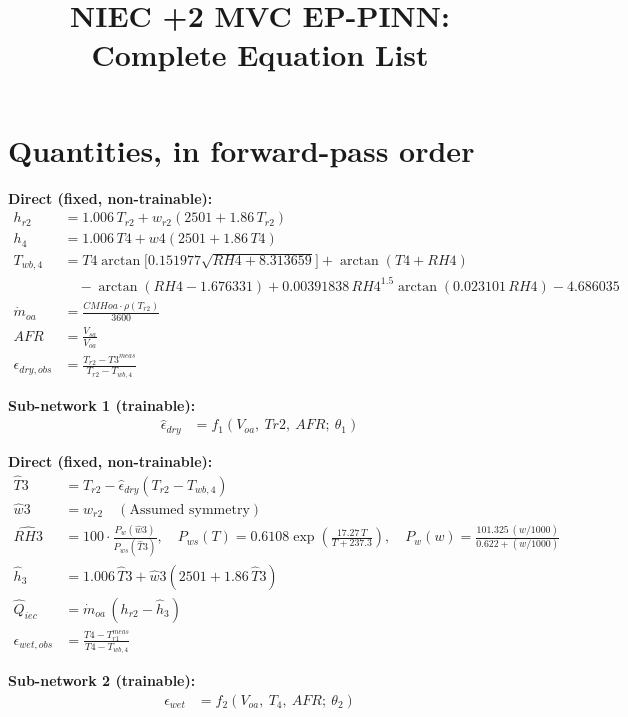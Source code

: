 \documentclass[11pt]{article}
\title{\vspace{-1.5em}NIEC +2 MVC EP-PINN: Complete Equation List\vspace{-1em}}
\author{}
\date{}
\begin{document}
\maketitle
\vspace{-2em}

\section*{Quantities, in forward-pass order}

\noindent\textbf{Direct (fixed, non-trainable):}
\begin{align}
h_{r2} &= 1.006\,T_{r2} + w_{r2}(2501+1.86\,T_{r2}) \\
h_4 &= 1.006\,T4 + w4(2501+1.86\,T4) \\
T_{wb,4} &= T4\arctan\!\big[0.151977\sqrt{RH4+8.313659}\big] + \arctan(T4+RH4) \nonumber\\
&\quad - \arctan(RH4-1.676331) + 0.00391838\,RH4^{1.5}\arctan(0.023101\,RH4) - 4.686035 \\
\dot m_{oa} &= \frac{CMHoa \cdot \rho(T_{r2})}{3600} \\
AFR  &= \frac{V_{sa}}{V_{oa}}\\
\epsilon_{dry,obs} &= \frac{T_{r2}-T3^{meas}}{T_{r2}-T_{wb,4}}
\end{align}

\noindent\textbf{Sub-network 1 (trainable):}
\begin{align}
\hat\epsilon_{dry} &= f_1(V_{oa},\ Tr2,\ AFR;\ \theta_1)
\end{align}

\noindent\textbf{Direct (fixed, non-trainable):}
\begin{align}
\hat T3 &= T_{r2} - \hat\epsilon_{dry}(T_{r2}-T_{wb,4}) \\
\hat w3 &= w_{r2} \quad (\text{Assumed symmetry}{})\\
\widehat{RH3} &= 100\cdot\frac{P_w(\hat w3)}{P_{ws}(\hat T3)}, \quad
P_{ws}(T)=0.6108\exp\!\left(\frac{17.27\,T}{T+237.3}\right),\quad
P_w(w)=\frac{101.325\,(w/1000)}{0.622+(w/1000)} \\
\hat h_3 &= 1.006\,\hat T3 + \hat w3(2501+1.86\,\hat T3) \\
\hat Q_{iec} &= \dot m_{oa}\,(h_{r2}-\hat h_3) \\
\epsilon_{wet,obs} &= \frac{T4-T_{r1}^{meas}}{T4-T_{wb,4}}
\end{align}

\noindent\textbf{Sub-network 2 (trainable):}
\begin{align}
\hat\epsilon_{wet} &= f_2(V_{oa},\ T_4,\ AFR;\ \theta_2)
\end{align}
\end{document}
